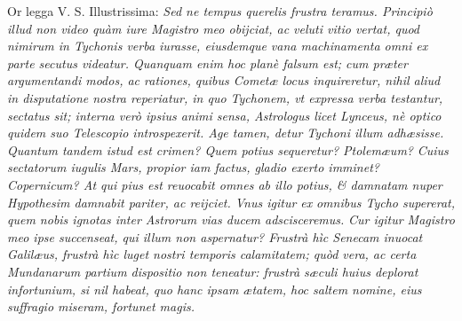 \documentclass[11pt,twoside,openany]{book}
\begin{document}
\par\bigskip\noindent{}\enspace Or legga V. S. Illustrissima: \textit{Sed ne tempus querelis frustra teramus. Principiò illud non video quàm iure Magistro meo obijciat, ac veluti vitio vertat, quod nimirum in Tychonis verba iurasse, eiusdemque vana machinamenta omni ex parte secutus videatur. Quanquam enim hoc planè falsum est; cum præter argumentandi modos, ac rationes, quibus Cometæ locus inquireretur, nihil aliud in disputatione nostra reperiatur, in quo Tychonem, vt expressa verba testantur, sectatus sit; interna verò ipsius animi sensa, Astrologus licet Lynceus, nè optico quidem suo Telescopio introspexerit. Age tamen, detur Tychoni illum adhæsisse. Quantum tandem istud est crimen? Quem potius sequeretur? Ptolemæum? }\textit{Cuius sectatorum iugulis Mars, propior iam factus, gladio exerto imminet? Copernicum? At qui pius est reuocabit omnes ab illo potius, \& damnatam nuper Hypothesim damnabit pariter, ac reijciet. Vnus igitur ex }\textit{omnibus Tycho supererat, quem nobis ignotas inter Astrorum vias ducem adscisceremus. }\textit{Cur igitur Magistro meo ipse succenseat, qui illum non aspernatur? Frustrà hìc Senecam inuocat Galilæus, frustrà hìc luget nostri temporis calamitatem; quòd vera, ac certa Mundanarum partium dispositio non teneatur: frustrà sæculi huius deplorat infortunium, si nil habeat, quo hanc ipsam ætatem, hoc saltem nomine, eius suffragio miseram, fortunet magis.}
\end{document}
